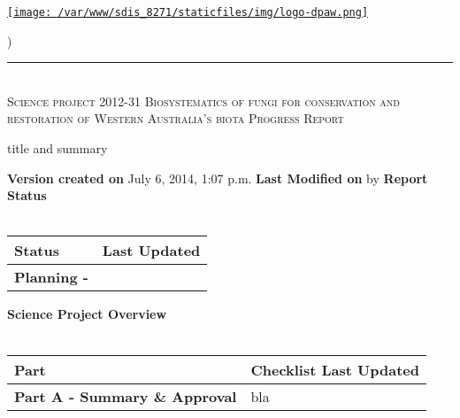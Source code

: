 \documentclass[version=last, paper=a4, DIV=18, usenames, dvipsnames]{scrartcl}
\newcommand{\HRule}{\rule{\linewidth}{0.1pt}}
\begin{document}
\setcounter{secnumdepth}{-1}


\begin{titlepage}
\begin{center}
\begin{minipage}[t]{0.28\textwidth}
\begin{flushleft}
\href{http://www.dpaw.wa.gov.au}{\texttt{[image: /var/www/sdis\_8271/staticfiles/img/logo-dpaw.png]}}
\end{flushleft}
\end{minipage}
\begin{minipage}[b]{0.7\textwidth}
\begin{flushright}
    \href{http://sdis.dpaw.wa.gov.au/documents/progressreport/1150/download/}{}) \\
\end{flushright}
\end{minipage}
\HRule \\[0.4cm]
\vfill
\textsc{\Huge Science project 2012-31 Biosystematics of fungi for conservation and restoration of Western Australia's biota \newline }
\vfill
\textsc{\Huge Progress Report}

\vfill\vfill\vfill\vfill
title and summary

\vfill\vfill\vfill\vfill\vfill\vfill\vfill\vfill

\textbf{Version created on} July 6, 2014, 1:07 p.m.
\vfill
\textbf{Last Modified on}  by 
\vfill\vfill
\textbf{Report Status}\\\,
\begin{tabu} to \linewidth { | X[l] | X | }
\hline
{}
Status & Last Updated \\
\hline
\textbf{Planning - } \\
\hline
\end{tabu}
\vfill
\textbf{Science Project Overview}\\\,
\begin{tabu} to \linewidth { | X[l] | X | }
\hline
{}
Part & Checklist Last Updated \\
\hline
\textbf{Part A - Summary \& Approval} & bla \\
\hline
\end{tabu}

\end{center}
\end{titlepage}

\setcounter{tocdepth}{2}
\tableofcontents
\clearpage
\end{document}
